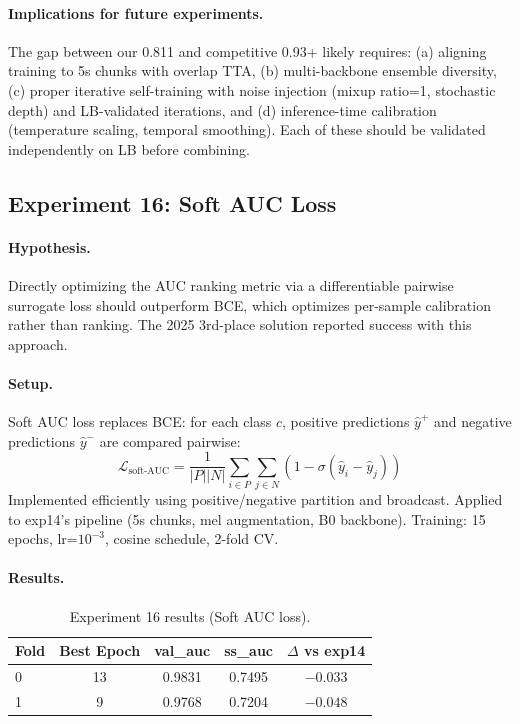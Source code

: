 \paragraph{Implications for future experiments.}
The gap between our 0.811 and competitive 0.93+ likely requires:
(a) aligning training to 5s chunks with overlap TTA,
(b) multi-backbone ensemble diversity,
(c) proper iterative self-training with noise injection (mixup ratio=1,
stochastic depth) and LB-validated iterations, and
(d) inference-time calibration (temperature scaling, temporal smoothing).
Each of these should be validated independently on LB before combining.

\subsection{Experiment 16: Soft AUC Loss}
\label{sec:exp16}

\paragraph{Hypothesis.}
Directly optimizing the AUC ranking metric via a differentiable pairwise
surrogate loss should outperform BCE, which optimizes per-sample calibration
rather than ranking. The 2025 3rd-place solution reported success with this approach.

\paragraph{Setup.}
Soft AUC loss replaces BCE: for each class $c$, positive predictions
$\hat{y}^+$ and negative predictions $\hat{y}^-$ are compared pairwise:
\[
\mathcal{L}_\text{soft-AUC} = \frac{1}{|P||N|} \sum_{i \in P} \sum_{j \in N}
(1 - \sigma(\hat{y}_i - \hat{y}_j))
\]
Implemented efficiently using positive/negative partition and broadcast.
Applied to exp14's pipeline (5s chunks, mel augmentation, B0 backbone).
Training: 15 epochs, lr=$10^{-3}$, cosine schedule, 2-fold CV.

\paragraph{Results.}
\begin{table}[h]
\centering
\caption{Experiment 16 results (Soft AUC loss).}
\label{tab:exp16}
\begin{tabular}{lcccc}
\hline
\textbf{Fold} & \textbf{Best Epoch} & \textbf{val\_auc} & \textbf{ss\_auc} & \textbf{$\Delta$ vs exp14} \\
\hline
0 & 13 & 0.9831 & 0.7495 & $-0.033$ \\
1 & 9 & 0.9768 & 0.7204 & $-0.048$ \\
\hline
\end{tabular}
\end{table}

